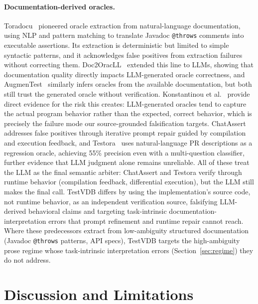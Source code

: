 \documentclass[sigconf]{acmart}
\begin{document}
\paragraph{Documentation-derived oracles.} Toradocu~\cite{toradocu16} pioneered oracle extraction from natural-language documentation, using NLP and pattern matching to translate Javadoc \texttt{@throws} comments into executable assertions. Its extraction is deterministic but limited to simple syntactic patterns, and it acknowledges false positives from extraction failures without correcting them. Doc2OracLL~\cite{doc2oracll25} extended this line to LLMs, showing that documentation quality directly impacts LLM-generated oracle correctness, and AugmenTest~\cite{augmentest25} similarly infers oracles from the available documentation, but both still trust the generated oracle without verification. Konstantinou et al.~\cite{konstantinou24} provide direct evidence for the risk this creates: LLM-generated oracles tend to capture the actual program behavior rather than the expected, correct behavior, which is precisely the failure mode our source-grounded falsification targets. ChatAssert~\cite{chatassert24} addresses false positives through iterative prompt repair guided by compilation and execution feedback, and Testora~\cite{testora26} uses natural-language PR descriptions as a regression oracle, achieving 55\% precision even with a multi-question classifier, further evidence that LLM judgment alone remains unreliable. All of these treat the LLM as the final semantic arbiter: ChatAssert and Testora verify through runtime behavior (compilation feedback, differential execution), but the LLM still makes the final call. TestVDB differs by using the implementation's source code, not runtime behavior, as an independent verification source, falsifying LLM-derived behavioral claims and targeting task-intrinsic documentation-interpretation errors that prompt refinement and runtime repair cannot reach. Where these predecessors extract from low-ambiguity structured documentation (Javadoc \texttt{@throws} patterns, API specs), TestVDB targets the high-ambiguity prose regime whose task-intrinsic interpretation errors (Section~\ref{sec:regime}) they do not address.

\section{Discussion and Limitations} \label{sec:disc}
\end{document}

